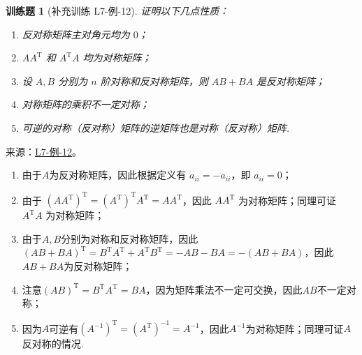 \documentclass[12pt,fontset=fandol]{ctexart}
\newtheorem{exercise}{训练题}[section]
\begin{document}
\begin{exercise}[补充训练 L7-例-12]\label{prob:L7-例-12}
证明以下几点性质：
    \begin{enumerate}
        \item 反对称矩阵主对角元均为 $0$；

        \item $AA^\mathrm{T}$ 和 $A^\mathrm{T}A$ 均为对称矩阵；

        \item 设 $A, B$ 分别为 $n$ 阶对称和反对称矩阵，则 $AB + BA$ 是反对称矩阵；

        \item 对称矩阵的乘积不一定对称；

        \item 可逆的对称（反对称）矩阵的逆矩阵也是对称（反对称）矩阵.
    \end{enumerate}
\end{exercise}
\noindent 来源：\href{https://github.com/yhwu-is/Linear-Algebra-Left-Undone/blob/new/%E8%AE%B2%E4%B9%89/%E4%B8%93%E9%A2%98/7%20%E7%BA%BF%E6%80%A7%E6%98%A0%E5%B0%84%E7%9F%A9%E9%98%B5%E8%A1%A8%E7%A4%BA%E4%B8%8E%E7%9F%A9%E9%98%B5%E8%BF%90%E7%AE%97%E5%9F%BA%E7%A1%80.tex}{L7-例-12}。
\begin{solve}
\begin{enumerate}
        \item 由于$A$为反对称矩阵，因此根据定义有 $a_{ii} = -a_{ii}$，即 $a_{ii} = 0$；

        \item 由于 $(AA^\mathrm{T})^\mathrm{T} = (A^\mathrm{T})^\mathrm{T}A^\mathrm{T} = AA^\mathrm{T}$，因此 $AA^\mathrm{T}$ 为对称矩阵；同理可证 $A^\mathrm{T}A$ 为对称矩阵；

        \item 由于$A,B$分别为对称和反对称矩阵，因此$(AB+BA)^\mathrm{T}=B^\mathrm{T}A^\mathrm{T}+A^\mathrm{T}B^\mathrm{T}=-AB-BA=-(AB+BA)$，因此$AB+BA$为反对称矩阵；

        \item 注意$(AB)^\mathrm{T}=B^\mathrm{T}A^\mathrm{T}=BA$，因为矩阵乘法不一定可交换，因此$AB$不一定对称；

        \item 因为$A$可逆有$(A^{-1})^\mathrm{T}=(A^\mathrm{T})^{-1}=A^{-1}$，因此$A^{-1}$为对称矩阵；同理可证$A$反对称的情况.
    \end{enumerate}
\end{solve}
\end{document}
